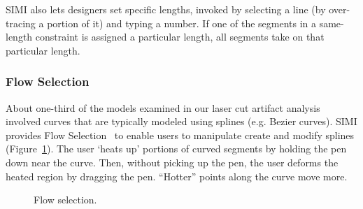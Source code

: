 \documentclass{article}
\begin{document}
SIMI also lets designers set specific lengths, invoked by selecting a
line (by over-tracing a portion of it) and typing a number. If one of
the segments in a same-length constraint is assigned a particular
length, all segments take on that particular length.

\subsubsection{Flow Selection}


About one-third of the models examined in our laser cut artifact
analysis involved curves that are typically modeled using splines
(e.g. Bezier curves). SIMI provides Flow
Selection~\cite{johnson-flow-selection} to enable users to manipulate
create and modify splines (Figure~\ref{fig:fs}). The user `heats up'
portions of curved segments by holding the pen down near the
curve. Then, without picking up the pen, the user deforms the heated
region by dragging the pen. ``Hotter'' points along the curve move
more.

\begin{figure}[h]
\centering {}
\hspace{3mm} 
\caption{Flow selection.}
\label{fig:fs}
\end{figure}
\end{document}
